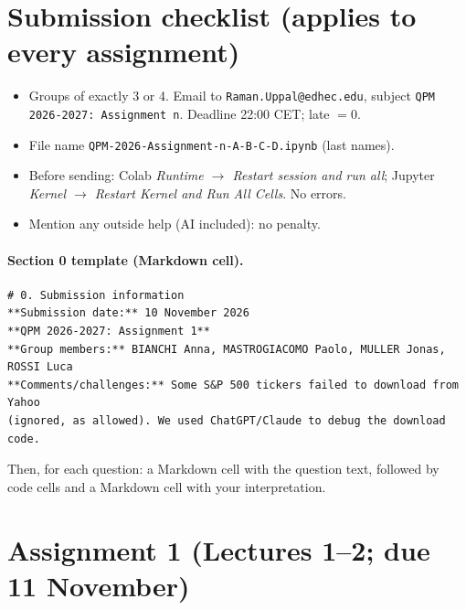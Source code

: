 \documentclass[11pt,a4paper]{report}
\begin{document}
\section{Submission checklist (applies to every assignment)}
\begin{itemize}
  \item Groups of exactly 3 or 4. Email to \texttt{Raman.Uppal@edhec.edu}, subject
    \texttt{QPM 2026-2027: Assignment n}. Deadline 22:00 CET; late $=0$.
  \item File name \texttt{QPM-2026-Assignment-n-A-B-C-D.ipynb} (last names).
  \item Before sending: Colab \emph{Runtime $\to$ Restart session and run all};
    Jupyter \emph{Kernel $\to$ Restart Kernel and Run All Cells}. No errors.
  \item Mention any outside help (AI included): no penalty.
\end{itemize}
\paragraph{Section 0 template (Markdown cell).}
\begin{lstlisting}[language={},numbers=none]
# 0. Submission information
**Submission date:** 10 November 2026
**QPM 2026-2027: Assignment 1**
**Group members:** BIANCHI Anna, MASTROGIACOMO Paolo, MULLER Jonas, ROSSI Luca
**Comments/challenges:** Some S&P 500 tickers failed to download from Yahoo
(ignored, as allowed). We used ChatGPT/Claude to debug the download code.
\end{lstlisting}
Then, for each question: a Markdown cell with the question text, followed by
code cells and a Markdown cell with your interpretation.

\section{Assignment 1 (Lectures 1--2; due 11 November)}
\end{document}
